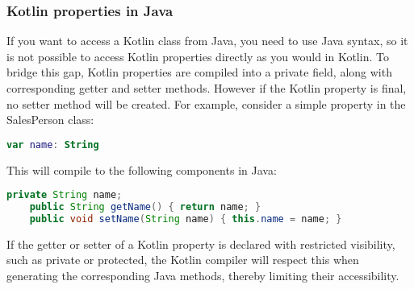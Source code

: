 \documentclass[a4paper, 11pt]{article}
\begin{document}
\subsubsection{Kotlin properties in Java}
  If you want to access a Kotlin class from Java, you need to use Java syntax, so it is not possible to access Kotlin properties directly as you would in Kotlin. To bridge this gap, Kotlin properties are compiled into a private field, along with corresponding getter and setter methods. However if the Kotlin property is final, no setter method will be created. For example, consider a simple property in the SalesPerson class:
  \begin{lstlisting}[language=Kotlin]
    var name: String
  \end{lstlisting}
  This will compile to the following components in Java:
  \begin{lstlisting}[language=Java]
    private String name;
    public String getName() { return name; }
    public void setName(String name) { this.name = name; }
  \end{lstlisting}
  If the getter or setter of a Kotlin property is declared with restricted visibility, such as private or protected, the Kotlin compiler will respect this when generating the corresponding Java methods, thereby limiting their accessibility.
\end{document}
